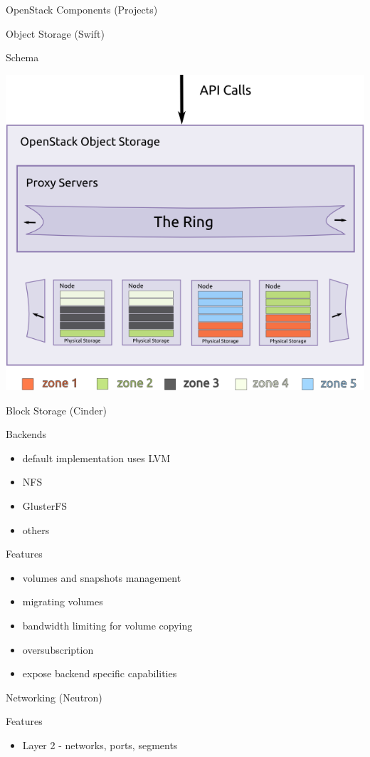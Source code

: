 \documentclass[presentation]{beamer}
\begin{document}
\begin{frame}[fragile,label={sec:orgdf62090}]{OpenStack Components (Projects)}
\begin{block}{Object Storage (Swift)}
\begin{block}{Schema}
\begin{center}
\includegraphics[width=.9\linewidth]{./objectstorage-buildingblocks.png}
\end{center}
\end{block}
\end{block}
\begin{block}{Block Storage (Cinder)}
\begin{block}{Backends}
\begin{itemize}
\item default implementation uses LVM
\item NFS
\item GlusterFS
\item others
\end{itemize}
\end{block}
\begin{block}{Features}
\begin{itemize}
\item volumes and snapshots management
\item migrating volumes
\item bandwidth limiting for volume copying
\item oversubscription
\item expose backend specific capabilities
\end{itemize}
\end{block}
\end{block}
\begin{block}{Networking (Neutron)}
\begin{block}{Features}
\begin{itemize}
\item Layer 2 - networks, ports, segments

\end{itemize}
\end{block}
\end{block}
\end{frame}
\end{document}
